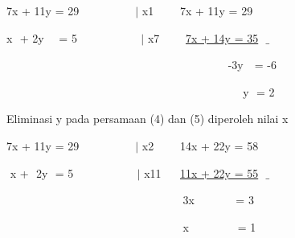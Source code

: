 \documentclass[11pt,fleqn]{book} %
\begin{document}
\begin{myEnumerate}
\begin{itemize}
\begin{myEnumerate}
			\noindent 
			7x + 11y = 29 $  $ $  $ $  $ $  $ $  $ $  $ $  $ $  $ $  $ $  $ $  $ $  $ $  $ $  $ $  \vert  $ x1 $  $ $  $ $  $ $  $ $  $ $  $ $  $7x + 11y = 29 \par
			\noindent 
			x $  $ $  $+ 2y $  $ $  $ $  $ $  $= 5 $  $ $  $ $  $ $  $ $  $ $  $ $  $ $  $ $  $ $  $ $  $ $  $ $  $ $  $ $  $ $  $ $  \vert  $ x7 $  $ $  $ $  $ $  $ $  $ $  $ $  $\underline{7x + 14y = 35} $  $ $  \_  $ \par
			\noindent 
			$  $ $  $ $  $ $  $ $  $ $  $ $  $ $  $ $  $ $  $ $  $ $  $ $  $ $  $ $  $ $  $ $  $ $  $ $  $ $  $ $  $ $  $ $  $ $  $ $  $ $  $ $  $ $  $ $  $ $  $ $  $ $  $ $  $ $  $ $  $ $  $ $  $ $  $ $  $ $  $ $  $ $  $ $  $ $  $ $  $ $  $ $  $ $  $ $  $ $  $ $  $ $  $ $  $ $  $ $  $ $  $ $  $ $  $ $  $ $  $-3y $  $ $  $ $  $= -6 \par
			\noindent 
			$  $ $  $ $  $ $  $ $  $ $  $ $  $ $  $ $  $ $  $ $  $ $  $ $  $ $  $ $  $ $  $ $  $ $  $ $  $ $  $ $  $ $  $ $  $ $  $ $  $ $  $ $  $ $  $ $  $ $  $ $  $ $  $ $  $ $  $ $  $ $  $ $  $ $  $ $  $ $  $ $  $ $  $ $  $ $  $ $  $ $  $ $  $ $  $ $  $ $  $ $  $ $  $ $  $ $  $ $  $ $  $ $  $ $  $ $  $ $  $ $  $ $  $ $  $ $  $y $  $ $  $= 2 \par
			\vspace{12pt}
			\noindent 
			Eliminasi y pada persamaan (4) dan (5) diperoleh nilai x \par
			\noindent 
			7x + 11y = 29 $  $ $  $ $  $ $  $ $  $ $  $ $  $ $  $ $  $ $  $ $  $ $  $ $  $ $  $ $  \vert  $ x2 $  $ $  $ $  $ $  $ $  $ $  $ $  $14x + 22y = 58 \par
			\noindent 
			$  $ $  $x + $  $ $  $2y $  $ $  $= 5 $  $ $  $ $  $ $  $ $  $ $  $ $  $ $  $ $  $ $  $ $  $ $  $ $  $ $  $ $  $ $  $ $  \vert  $ x11 $  $ $  $ $  $ $  $ $  $\underline{11x + 22y = 55} $  $ $  \_  $ \par
			\noindent 
			$  $ $  $ $  $ $  $ $  $ $  $ $  $ $  $ $  $ $  $ $  $ $  $ $  $ $  $ $  $ $  $ $  $ $  $ $  $ $  $ $  $ $  $ $  $ $  $ $  $ $  $ $  $ $  $ $  $ $  $ $  $ $  $ $  $ $  $ $  $ $  $ $  $ $  $ $  $ $  $ $  $ $  $ $  $ $  $ $  $ $  $ $  $ $  $3x $  $ $  $ $  $ $  $ $  $ $  $ $  $ $  $ $  $ $  $ $  $= 3 \par
			\noindent 
			$  $ $  $ $  $ $  $ $  $ $  $ $  $ $  $ $  $ $  $ $  $ $  $ $  $ $  $ $  $ $  $ $  $ $  $ $  $ $  $ $  $ $  $ $  $ $  $ $  $ $  $ $  $ $  $ $  $ $  $ $  $ $  $ $  $ $  $ $  $ $  $ $  $ $  $ $  $ $  $ $  $ $  $ $  $ $  $ $  $ $  $ $  $ $  $x $  $ $  $ $  $ $  $ $  $ $  $ $  $ $  $ $  $ $  $ $  $ $  $ $  $= 1 \par

\end{myEnumerate}
\end{itemize}
\end{myEnumerate}
\end{document}
